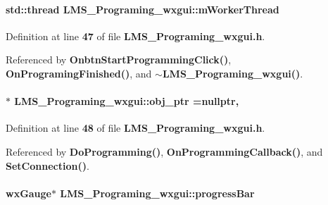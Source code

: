\paragraph[{m\+Worker\+Thread}]{\setlength{\rightskip}{0pt plus 5cm}std\+::thread L\+M\+S\+\_\+\+Programing\+\_\+wxgui\+::m\+Worker\+Thread\hspace{0.3cm}{\ttfamily [protected]}}\label{classLMS__Programing__wxgui_aa922409f6619152464ce4cbc218e6978}


Definition at line {\bf 47} of file {\bf L\+M\+S\+\_\+\+Programing\+\_\+wxgui.\+h}.



Referenced by {\bf Onbtn\+Start\+Programming\+Click()}, {\bf On\+Programing\+Finished()}, and {\bf $\sim$\+L\+M\+S\+\_\+\+Programing\+\_\+wxgui()}.

\paragraph[{obj\+\_\+ptr}]{ $\ast$ L\+M\+S\+\_\+\+Programing\+\_\+wxgui\+::obj\+\_\+ptr =nullptr\hspace{0.3cm}{\ttfamily [static]}, {\ttfamily [protected]}}\label{classLMS__Programing__wxgui_a7d5c40f56f0bc336674d16a031555da4}


Definition at line {\bf 48} of file {\bf L\+M\+S\+\_\+\+Programing\+\_\+wxgui.\+h}.



Referenced by {\bf Do\+Programming()}, {\bf On\+Programming\+Callback()}, and {\bf Set\+Connection()}.

\paragraph[{progress\+Bar}]{\setlength{\rightskip}{0pt plus 5cm}wx\+Gauge$\ast$ L\+M\+S\+\_\+\+Programing\+\_\+wxgui\+::progress\+Bar\hspace{0.3cm}{\ttfamily [protected]}}\label{classLMS__Programing__wxgui_a1472c34367a4e14ab820496c7a2a9ce5}


